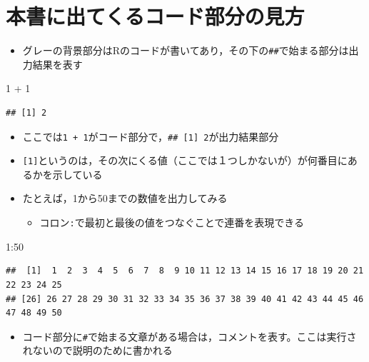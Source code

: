 \documentclass[
  xelatex,ja=standard, b5paper]{bxjsbook}
\newenvironment{Shaded}{\begin{snugshade}}{\end{snugshade}}
\newcommand{\DecValTok}[1]{\textcolor[rgb]{0.00,0.00,0.81}{#1}}
\newcommand{\SpecialCharTok}[1]{\textcolor[rgb]{0.00,0.00,0.00}{#1}}
\providecommand{\tightlist}{%
  \setlength{\itemsep}{0pt}\setlength{\parskip}{0pt}}
\begin{document}
\hypertarget{p-howtoread}{%
\section{本書に出てくるコード部分の見方}\label{p-howtoread}}

\begin{itemize}
\tightlist
\item
  グレーの背景部分はRのコードが書いてあり，その下の\texttt{\#\#}で始まる部分は出力結果を表す
\end{itemize}

\begin{Shaded}
\begin{Highlighting}[]
\DecValTok{1} \SpecialCharTok{+} \DecValTok{1}
\end{Highlighting}
\end{Shaded}

\begin{verbatim}
## [1] 2
\end{verbatim}

\begin{itemize}
\tightlist
\item
  ここでは\texttt{1\ +\ 1}がコード部分で，\texttt{\#\#\ {[}1{]}\ 2}が出力結果部分
\item
  \texttt{{[}1{]}}というのは，その次にくる値（ここでは１つしかないが）が何番目にあるかを示している
\item
  たとえば，1から50までの数値を出力してみる

  \begin{itemize}
  \tightlist
  \item
    コロン\texttt{:}で最初と最後の値をつなぐことで連番を表現できる
  \end{itemize}
\end{itemize}

\begin{Shaded}
\begin{Highlighting}[]
\DecValTok{1}\SpecialCharTok{:}\DecValTok{50}
\end{Highlighting}
\end{Shaded}

\begin{verbatim}
##  [1]  1  2  3  4  5  6  7  8  9 10 11 12 13 14 15 16 17 18 19 20 21 22 23 24 25
## [26] 26 27 28 29 30 31 32 33 34 35 36 37 38 39 40 41 42 43 44 45 46 47 48 49 50
\end{verbatim}

\begin{itemize}
\tightlist
\item
  コード部分に\texttt{\#}で始まる文章がある場合は，コメントを表す。ここは実行されないので説明のために書かれる
\end{itemize}
\end{document}
